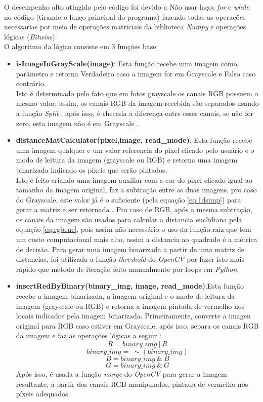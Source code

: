 \documentclass{bmvc2k}
\begin{document}
    O desempenho alto atingido pelo código foi devido a Não usar laços \textit{for} e \textit{while} no código (tirando o lanço principal do programa) fazendo todas as operações necessarias por meio de operações matriciais da biblioteca \textit{Numpy} \cite{noloop} e operações lógicas (\textit{Bitwise}).\\
    O algoritmo da lógico consiste em 3 funções base:
    \begin{itemize}
        \item \textbf{isImageInGrayScale(image)}: Esta função recebe uma imagem como parâmetro e retorna Verdadeiro caso a imagem for em Grayscale e Falso caso contrário.\\
        Isto é determinado pelo fato que em fotos grayscale os canais RGB possuem o mesmo valor, assim, os canais RGB da imagem recebida são separados usando a função \textit{Split} \cite{splitshapemerge}, após isso, é checada a diferença entre esses canais, se não for zero, esta imagem não é em Grayscale \cite{colorspaces}.
        \item \textbf{distanceMatCalculator(pixel,image, read\_mode)}: Esta função recebe uma imagem qualquer e um valor referencia do pixel clicado pelo usuário e o modo de leitura da imagem (grayscale ou RGB) e retorna uma imagem binarizada indicado os píxeis que serão pintados.\\ 
        Isto é feito criando uma imagem auxiliar com a cor do pixel clicado igual ao tamanho da imagem original, faz a subtração entre as duas imagens, pro caso do Grayscale, este valor já é o suficiente (pela equação \ref{eq:1dsimp}) para gerar a matriz a ser retornada \cite{MatForImage}. Pro caso de RGB, após a mesma subtração, os canais da imagem são usados para calcular a distancia euclidiana pela equação \ref{eq:rgbeuc}, pois assim não necessário o uso da função raíz que tem um custo computacional mais alto, assim a distancia ao quadrado é a métrica de decisão. Para gerar uma imagem binarizada a partir de uma matriz de distancias, foi utilizada a função \textit{threshold} do \textit{OpenCV} \cite{threshold} por fazer isto mais rápido que método de iteração feito manualmente por loops em \textit{Python}.
        \item \textbf{insertRedByBinary(binary\_img, image, read\_mode)}:Esta função recebe a imagem binarizada, a imagem original e o modo de leitura da imagem (grayscale ou RGB) e retorna a imagem pintada de vermelho nos locais indicados pela imagem binarizada.
        Primeiramente, converte a imagen original para RGB caso estiver em Grayscale, após isso, separa os canais RGB da imagem e faz as operações lógicas a seguir :
        \[R = binary\_img ~|~ R\]
        \vspace{-3mm}
        \[binary\_img =~ \sim (binary\_img)\]
        \vspace{-3mm}
        \[B = binary\_img ~\&~ B\]
        \vspace{-3mm}
        \[G = binary\_img ~\&~ G\]
        Após isso, é usada a função \textit{merge} \cite{splitshapemerge} do \textit{OpenCV} para gerar a imagem resultante, a partir dos canais RGB manipulados, pintada de vermelho nos píxeis adequados.
    \end{itemize}
\end{document}

